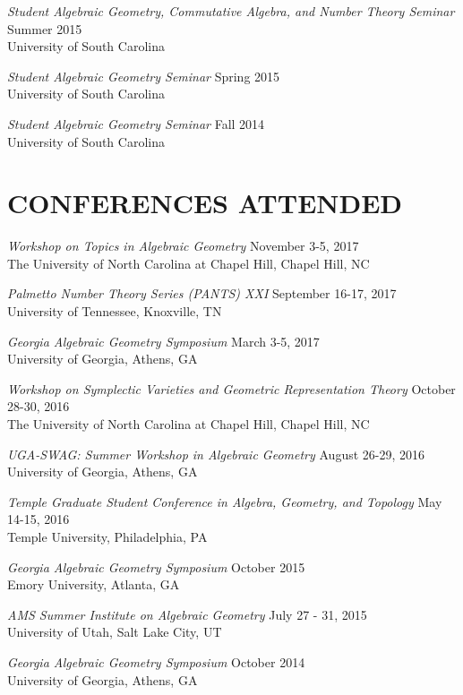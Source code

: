 \documentclass[line,overlapped]{res}
\begin{document}
\begin{resume}
  \textsl{Student Algebraic Geometry, Commutative Algebra, and Number Theory Seminar} \hfill Summer 2015\\
  University of South Carolina
  
  \textsl{Student Algebraic Geometry Seminar} \hfill Spring 2015\\
  University of South Carolina

  \textsl{Student Algebraic Geometry Seminar} \hfill Fall 2014\\
  University of South Carolina
  \newpage

  \section{CONFERENCES ATTENDED}
  \textsl{Workshop on Topics in Algebraic Geometry} \hfill November 3-5, 2017\\
  The University of North Carolina at Chapel Hill, Chapel Hill, NC
  
  \textsl{Palmetto Number Theory Series (PANTS) XXI} \hfill September 16-17, 2017\\
  University of Tennessee, Knoxville, TN
  
  \textsl{Georgia Algebraic Geometry Symposium} \hfill March 3-5, 2017\\
  University of Georgia, Athens, GA

  \textsl{Workshop on Symplectic Varieties and Geometric Representation Theory} \hfill October 28-30, 2016\\
  The University of North Carolina at Chapel Hill, Chapel Hill, NC
  
  \textsl{UGA-SWAG: Summer Workshop in Algebraic Geometry} \hfill August 26-29, 2016\\
  University of Georgia, Athens, GA

  \textsl{Temple Graduate Student Conference in Algebra, Geometry, and Topology} \hfill May 14-15, 2016\\
  Temple University, Philadelphia, PA
  
  \textsl{Georgia Algebraic Geometry Symposium} \hfill October 2015\\
  Emory University, Atlanta, GA

  \textsl{AMS Summer Institute on Algebraic Geometry} \hfill July 27 - 31, 2015\\
  University of Utah, Salt Lake City, UT

  \textsl{Georgia Algebraic Geometry Symposium} \hfill October 2014\\
  University of Georgia, Athens, GA


\end{resume}
\end{document}
